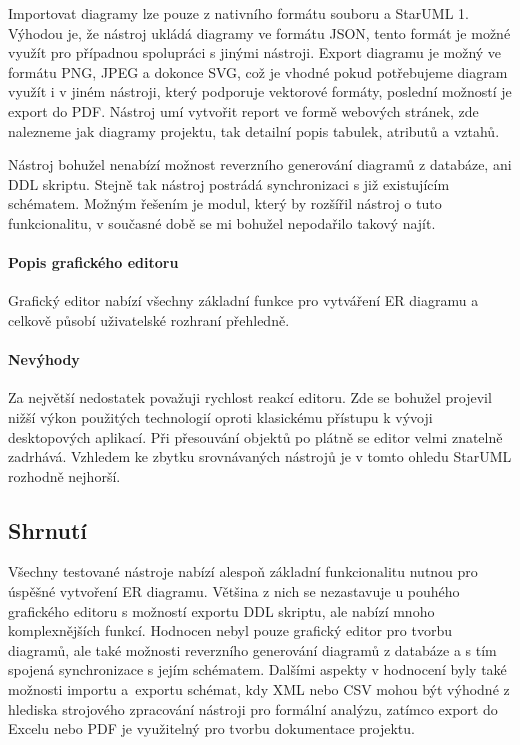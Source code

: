 \documentclass[czech,bachelor,public,dept460,male,oneside]{diploma}
\begin{document}
		Importovat diagramy lze pouze z nativního formátu souboru a StarUML 1. Výhodou je, že nástroj ukládá diagramy ve formátu JSON, tento formát je možné využít pro případnou spolupráci s jinými nástroji. Export diagramu je možný ve formátu PNG, JPEG a dokonce SVG, což je vhodné pokud potřebujeme diagram využít i v jiném nástroji, který podporuje vektorové formáty, poslední možností je export do PDF. Nástroj umí vytvořit report ve formě webových stránek, zde nalezneme jak diagramy projektu, tak detailní popis tabulek, atributů a vztahů. 
		
		Nástroj bohužel nenabízí možnost reverzního generování diagramů z databáze, ani DDL skriptu. Stejně tak nástroj postrádá synchronizaci s již existujícím schématem. Možným řešením je modul, který by rozšířil nástroj o tuto funkcionalitu, v současné době se mi bohužel nepodařilo takový najít.
		\paragraph{Popis grafického editoru}
		Grafický editor nabízí všechny základní funkce pro vytváření ER diagramu a celkově působí uživatelské rozhraní přehledně. 
		
		\paragraph{Nevýhody}
		Za největší nedostatek považuji rychlost reakcí editoru. Zde se bohužel projevil nižší výkon použitých technologií oproti klasickému přístupu k vývoji desktopových aplikací. Při přesouvání objektů po plátně se editor velmi znatelně zadrhává. Vzhledem ke zbytku srovnávaných nástrojů je v tomto ohledu StarUML rozhodně nejhorší.
	
	\subsection{Shrnutí}
	Všechny testované nástroje nabízí alespoň základní funkcionalitu nutnou pro úspěšné vytvoření ER diagramu. Většina z nich se nezastavuje u pouhého grafického editoru s možností exportu DDL skriptu, ale nabízí mnoho komplexnějších funkcí. Hodnocen nebyl pouze grafický editor pro tvorbu diagramů, ale také možnosti reverzního generování diagramů z databáze a s tím spojená synchronizace s jejím schématem. Dalšími aspekty v hodnocení byly také možnosti importu a~exportu schémat, kdy XML nebo CSV mohou být výhodné z hlediska strojového zpracování nástroji pro formální analýzu, zatímco export do Excelu nebo PDF je využitelný pro tvorbu dokumentace projektu.
	
\end{document}
